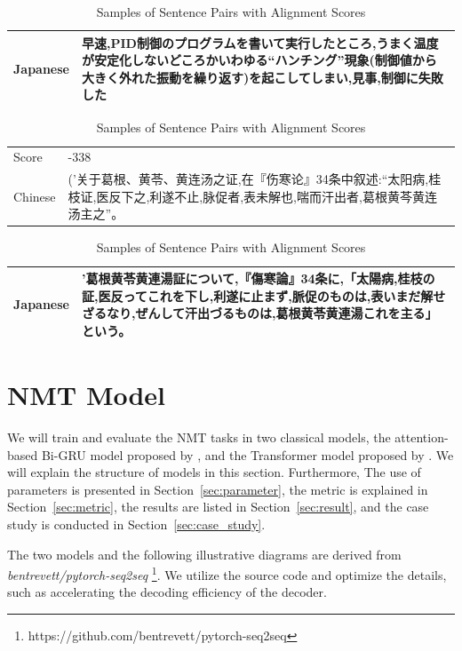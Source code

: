 \begin{table}[h]
\begin{CJK}{UTF8}{long}
        \begin{tabularx}{\textwidth}{lb}
            Japanese & 早速,PID制御のプログラムを書いて実行したところ,うまく温度が安定化しないどころかいわゆる“ハンチング”現象(制御値から大きく外れた振動を繰り返す)を起こしてしまい,見事,制御に失敗した \\
            \midrule
        \end{tabularx}
    \end{CJK}
    \begin{CJK}{UTF8}{gbsn}
        \begin{tabularx}{\textwidth}{lb}
            Score & -338 \\
            {Chinese } & ('关于葛根、黄苓、黄连汤之证,在『伤寒论』34条中叙述:“太阳病,桂枝证,医反下之,利遂不止,脉促者,表未解也,喘而汗出者,葛根黄芩黄连汤主之”。 \\
        \end{tabularx}
    \end{CJK}
    \begin{CJK}{UTF8}{long}
        \begin{tabularx}{\textwidth}{lb}
            Japanese & '葛根黄苓黄連湯証について,『傷寒論』34条に,「太陽病,桂枝の証,医反ってこれを下し,利遂に止まず,脈促のものは,表いまだ解せざるなり,ぜんして汗出づるものは,葛根黄苓黄連湯これを主る」という。 \\
            \midrule
        \end{tabularx}
    \end{CJK}
    \caption{Samples of Sentence Pairs with Alignment Scores}
    \label{tab:alignment_samples}
\end{table}

\section{NMT Model} \label{sec:nmt_model}

We will train and evaluate the NMT tasks in two classical models, the attention-based Bi-GRU model proposed by \cite{bahdanau2014neural}, and the Transformer model proposed by \cite{NIPS2017_3f5ee243}. We will explain the structure of models in this section. Furthermore, The use of parameters is presented in Section~\ref{sec:parameter}, the metric is explained in Section~\ref{sec:metric}, the results are listed in Section~\ref{sec:result}, and the case study is conducted in Section~\ref{sec:case_study}.

The two models and the following illustrative diagrams are derived from \textit{bentrevett/pytorch-seq2seq} \footnote{https://github.com/bentrevett/pytorch-seq2seq}. We utilize the source code and optimize the details, such as accelerating the decoding efficiency of the decoder.

